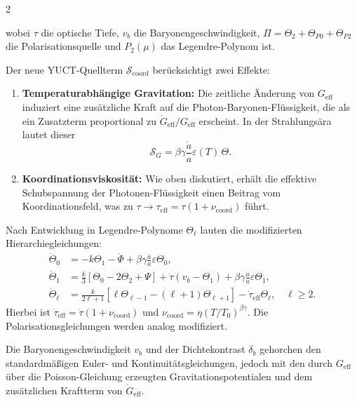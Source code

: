 \documentclass[11pt,a4paper]{article}
\begin{document}
	\begin{multicols}{2}
		
		\noindent wobei $\tau$ die optische Tiefe, $v_b$ die Baryonengeschwindigkeit, $\Pi = \Theta_2 + \Theta_{P0} + \Theta_{P2}$ die Polarisationsquelle und $P_2(\mu)$ das Legendre-Polynom ist.
		
		Der neue YUCT-Quellterm $\mathcal{S}_{\mathrm{coord}}$ berücksichtigt zwei Effekte:
		\begin{enumerate}
			\item \textbf{Temperaturabhängige Gravitation:} Die zeitliche Änderung von $G_{\mathrm{eff}}$ induziert eine zusätzliche Kraft auf die Photon-Baryonen-Flüssigkeit, die als ein Zusatzterm proportional zu $\dot{G}_{\mathrm{eff}}/G_{\mathrm{eff}}$ erscheint. In der Strahlungsära lautet dieser
			\begin{equation}
				\mathcal{S}_G = \beta\gamma \frac{\dot{a}}{a} \varepsilon(T) \, \Theta.
			\end{equation}
			\item \textbf{Koordinationsviskosität:} Wie oben diskutiert, erhält die effektive Schubspannung der Photonen-Flüssigkeit einen Beitrag vom Koordinationsfeld, was zu $\tau \to \tau_{\mathrm{eff}} = \tau (1 + \nu_{\mathrm{coord}})$ führt.
		\end{enumerate}
		
		Nach Entwicklung in Legendre-Polynome $\Theta_\ell$ lauten die modifizierten Hierarchiegleichungen:
		\begin{align}
			\dot{\Theta}_0 &= -k\Theta_1 - \dot{\Phi} + \beta\gamma \frac{\dot{a}}{a} \varepsilon \Theta_0, \label{eq:hier0}\\
			\dot{\Theta}_1 &= \frac{k}{3}\left[\Theta_0 - 2\Theta_2 + \Psi\right] + \dot{\tau}(v_b - \Theta_1) + \beta\gamma \frac{\dot{a}}{a} \varepsilon \Theta_1, \label{eq:hier1}\\
			\dot{\Theta}_\ell &= \frac{k}{2\ell+1}\left[\ell\Theta_{\ell-1} - (\ell+1)\Theta_{\ell+1}\right] - \dot{\tau}_{\mathrm{eff}}\Theta_\ell, \quad \ell \ge 2. \label{eq:hier_ell}
		\end{align}
		Hierbei ist $\dot{\tau}_{\mathrm{eff}} = \dot{\tau}(1 + \nu_{\mathrm{coord}})$ und $\nu_{\mathrm{coord}} = \eta (T/T_0)^{\beta\gamma}$. Die Polarisationsgleichungen werden analog modifiziert.
		
		Die Baryonengeschwindigkeit $v_b$ und der Dichtekontrast $\delta_b$ gehorchen den standardmäßigen Euler- und Kontinuitätsgleichungen, jedoch mit den durch $G_{\mathrm{eff}}$ über die Poisson-Gleichung erzeugten Gravitationspotentialen und dem zusätzlichen Kraftterm von $\dot{G}_{\mathrm{eff}}$.
		

\end{multicols}
\end{document}
